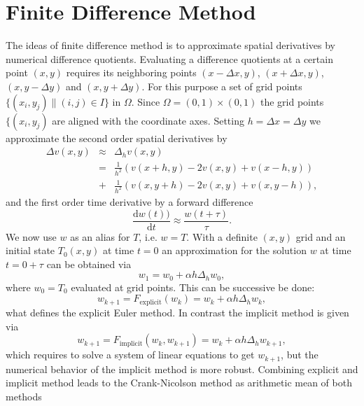 \documentclass[a4paper,11pt]{article}
\theoremstyle{plain} %
\theoremstyle{definition} %
\theoremstyle{remark} %
\def\Temp{T}
\def\uTemp{u}
\def\uTemp{w}
\begin{document}
\section{Finite Difference Method}
The ideas of finite difference method is to approximate spatial derivatives by numerical difference quotients. Evaluating a difference quotients at a certain point $(x,y)$ requires its neighboring points $(x-\Delta x,y)$, $(x+\Delta x,y)$, $(x,y-\Delta y)$ and $(x,y+\Delta y)$. For this purpose a set of grid points $\{ (x_i, y_j) \| (i,j) \in I\} $ in $\Omega $. Since $\Omega = ( 0,1 ) \times ( 0,1 ) $ the grid points $\{ (x_i, y_j) $ are aligned with the coordinate axes.
Setting $ h= \Delta x = \Delta y $ we approximate the second order spatial derivatives by
\begin{eqnarray*}
\Delta v(x,y) & \approx & \Delta_h v(x,y) \\
 & = & \frac{1}{h^2}\left(v(x+h, y) -2 v(x,y) + v(x-h,y) \right) \\
& + & \frac{1}{h^2}\left( v(x, y+h) -2 v(x,y) + v(x,y-h) \right),
\end{eqnarray*}
and the first order time derivative by a forward difference
\begin{equation*}
\frac{\mathrm{d} w(t) )}{\mathrm{d} t } \approx \frac{w(t+\tau )}{\tau } .
\end{equation*}
We now use $ \uTemp $ as an alias for $ \Temp $, i.e. $\uTemp = \Temp $.
With a definite $(x,y)$ grid and an initial state $T_0 (x,y) $ at time $t=0$ an approximation for the solution $\uTemp$ at time $t= 0 +\tau $ can be obtained via
\begin{equation*}
\uTemp_1 = \uTemp_0 + \alpha h\Delta_h \uTemp_0,
\end{equation*}
where $ \uTemp_0 = T_0 $ evaluated at grid points. This can be successive be done:
\begin{equation*}
\uTemp_{k+1} = F_{\mathrm{explicit}} (\uTemp_k) = \uTemp_k + \alpha h \Delta_h \uTemp_k,
\end{equation*}
what defines the explicit Euler method. In contrast the implicit method is given via
\begin{equation*}
\uTemp_{k+1} = F_{\mathrm{implicit}} (\uTemp_k, \uTemp_{k+1}) =\uTemp_k + \alpha h \Delta_h \uTemp_{k+1},
\end{equation*}
which requires to solve a system of linear equations to get $\uTemp_{k+1} $, but the numerical behavior of the implicit method is more robust.
Combining explicit and implicit method leads to the Crank-Nicolson method as arithmetic mean of both methods
\end{document}
